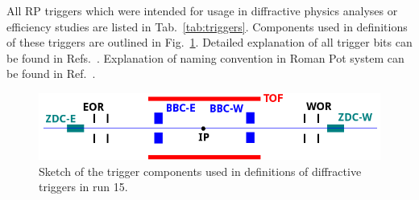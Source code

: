 All RP triggers which were intended for usage in diffractive physics analyses or efficiency studies are listed in Tab.~\ref{tab:triggers}. Components used in definitions of these triggers are outlined in Fig.~\ref{fig:triggerBits}. Detailed explanation of all trigger bits can be found in Refs.~\cite{RpTriggers,RpTriggers2}. Explanation of naming convention in Roman Pot system can be found in Ref.~\cite{Labeling}.

\begin{figure}[h]
 \centering%
 \includegraphics[width=0.71\linewidth]{graphics/dataset/bits.png}%
 \caption{Sketch of the trigger components used in definitions of diffractive triggers in run 15.}\label{fig:triggerBits}%
 \end{figure}



